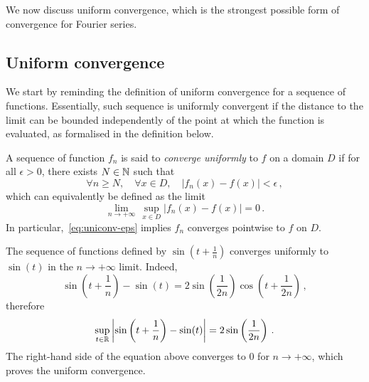 We now discuss uniform convergence, which is the strongest possible form of convergence
for Fourier series.
\subsection{Uniform convergence}
We start by reminding the definition of uniform convergence for a sequence of functions.
Essentially, such sequence is uniformly convergent if the distance to the limit can be
bounded independently of the point at which the function is evaluated, as formalised in
the definition below.
\begin{definition}
  \label{def:uni-cvg}
  A sequence of function $f_n$ is said to \emph{converge uniformly} to $f$ on a domain $D$
  if for all $\epsilon>0$, there exists $N\in\mathbb{N}$ such that
  \begin{equation}
    \forall n\geq N,\quad\forall x\in D,\quad|f_n(x)-f(x)|<\epsilon\,,\label{eq:uniconv-eps}
  \end{equation}
  which can equivalently be defined as the limit
  \begin{equation}
    \lim_{n\to+\infty}\,\sup_{x\in D}|f_n(x)-f(x)|=0\,.
  \end{equation}
  In particular,~\cref{eq:uniconv-eps} implies $f_n$ converges pointwise to $f$ on $D$.
\end{definition}
\begin{example}
  The sequence of functions defined by $\sin(t+\frac{1}{n})$ converges uniformly to
  $\sin(t)$ in the $n\to+\infty$ limit. Indeed,
  \begin{equation}
    \sin\left(t+\frac{1}{n}\right)-\sin(t)
    =2\sin\left(\frac{1}{2n}\right)\cos\left(t+\frac{1}{2n}\right)\,,
  \end{equation}
  therefore
  \begin{equation}
    \sup_{t\in\mathbb{R}}\left|\sin\left(t+\frac{1}{n}\right)
    -\sin(t)\right|=2\sin\left(\frac{1}{2n}\right)\,.
  \end{equation}
  The right-hand side of the equation above converges to $0$ for $n\to+\infty$, which
  proves the uniform convergence.
\end{example}
